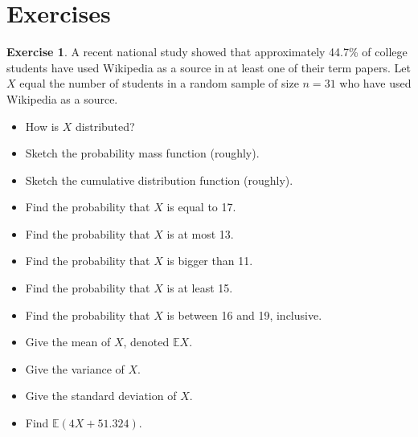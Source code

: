 \documentclass[]{book}
\providecommand{\tightlist}{%
  \setlength{\itemsep}{0pt}\setlength{\parskip}{0pt}}
\numberwithin{equation}{chapter}
\numberwithin{figure}{chapter}
\theoremstyle{plain}
\theoremstyle{definition}
\newtheorem{xca}{Exercise}[chapter]
\theoremstyle{remark}
\theoremstyle{definition}
\theoremstyle{definition}
\theoremstyle{remark}
\begin{document}
\section{Exercises}\label{exercises-3}

\begin{xca}
A recent national study showed that approximately 44.7\% of college
students have used Wikipedia as a source in at least one of their term
papers. Let \(X\) equal the number of students in a random sample of
size \(n=31\) who have used Wikipedia as a source.

\begin{itemize}
\tightlist
\item
  How is \(X\) distributed?
\item
  Sketch the probability mass function (roughly).
\item
  Sketch the cumulative distribution function (roughly).
\item
  Find the probability that \(X\) is equal to 17.
\item
  Find the probability that \(X\) is at most 13.
\item
  Find the probability that \(X\) is bigger than 11.
\item
  Find the probability that \(X\) is at least 15.
\item
  Find the probability that \(X\) is between 16 and 19, inclusive.
\item
  Give the mean of \(X\), denoted \(\mathbb{E} X\).
\item
  Give the variance of \(X\).
\item
  Give the standard deviation of \(X\).
\item
  Find \(\mathbb{E}(4X + 51.324)\).
\end{itemize}
\end{xca}

\bigskip
\end{document}
